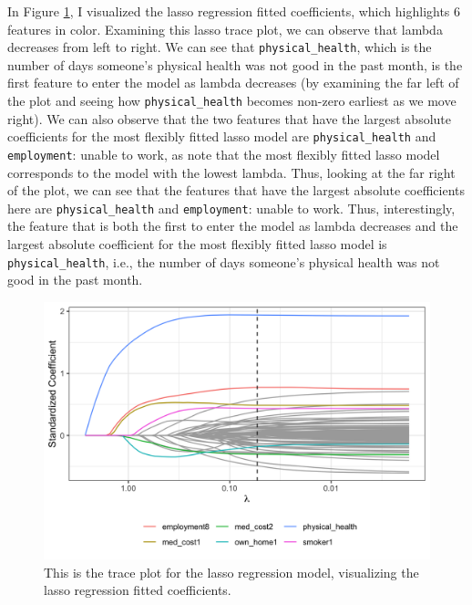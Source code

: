\documentclass[
]{article}
\begin{document}
In Figure \ref{fig:lasso-trace-plot}, I visualized the lasso regression fitted coefficients, which highlights 6 features in color. Examining this lasso trace plot, we can observe that lambda decreases from left to right. We can see that \texttt{physical\_health}, which is the number of days someone's physical health was not good in the past month, is the first feature to enter the model as lambda decreases (by examining the far left of the plot and seeing how \texttt{physical\_health} becomes non-zero earliest as we move right). We can also observe that the two features that have the largest absolute coefficients for the most flexibly fitted lasso model are \texttt{physical\_health} and \texttt{employment}: unable to work, as note that the most flexibly fitted lasso model corresponds to the model with the lowest lambda. Thus, looking at the far right of the plot, we can see that the features that have the largest absolute coefficients here are \texttt{physical\_health} and \texttt{employment}: unable to work. Thus, interestingly, the feature that is both the first to enter the model as lambda decreases and the largest absolute coefficient for the most flexibly fitted lasso model is \texttt{physical\_health}, i.e., the number of days someone's physical health was not good in the past month.

\begin{figure}[H]

{\centering \includegraphics[width=0.8\linewidth]{../results/lasso-trace-plot} 

}

\caption{This is the trace plot for the lasso regression model, visualizing the lasso regression fitted coefficients.}\label{fig:lasso-trace-plot}
\end{figure}
\end{document}
